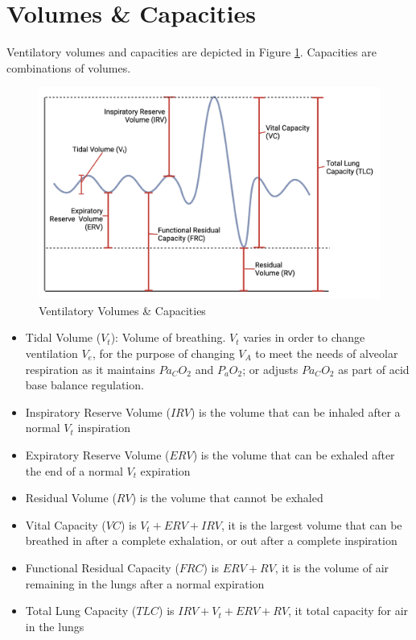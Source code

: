 \section{Volumes \& Capacities}

Ventilatory volumes and capacities are depicted in Figure \ref{fig:ventilation_volumes}. Capacities are combinations of volumes.

\begin{figure}[!h]
    \centering
    \includegraphics[width=1.0 \linewidth]{./figure/ventilation/ventilation_volumes.png}
    \caption{Ventilatory Volumes \& Capacities}
    \label{fig:ventilation_volumes}
\end{figure}

\begin{itemize}
    \item Tidal Volume ($V_t$): Volume of breathing. $V_t$ varies in order to change ventilation $V_e$, for the purpose of changing $V_A$ to meet the needs of alveolar respiration as it maintains $Pa_CO_2$ and $P_aO_2$; or adjusts $Pa_CO_2$ as part of acid base balance regulation.
    \item Inspiratory Reserve Volume ($IRV$) is the volume that can be inhaled after a normal $V_t$ inspiration
    \item Expiratory Reserve Volume ($ERV$) is the volume that can be exhaled after the end of a normal $V_t$ expiration
    \item Residual Volume ($RV$) is the volume that cannot be exhaled
    \item Vital Capacity ($VC$) is $V_t + ERV + IRV$, it is the largest volume that can be breathed in after a complete exhalation, or out after a complete inspiration
    \item Functional Residual Capacity ($FRC$) is $ERV + RV$, it is the volume of air remaining in the lungs after a normal expiration
    \item Total Lung Capacity ($TLC$) is $IRV + V_t + ERV + RV$, it total capacity for air in the lungs
\end{itemize}

